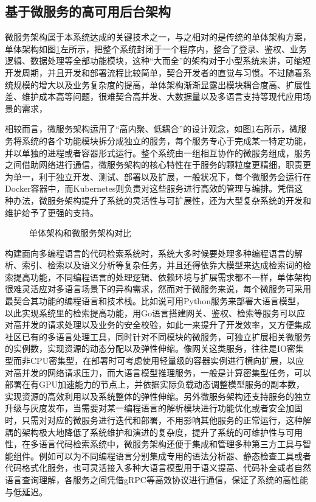 \documentclass[UTF8,a4paper,12pt]{ctexart}
\numberwithin{equation}{section}
\begin{document}
\subsection{基于微服务的高可用后台架构}
微服务架构属于本系统达成的关键技术之一，与之相对的是传统的单体架构方案，单体架构\cite{ref18.5}如图\ref{compare}左所示，把整个系统封闭于一个程序内，整合了登录、鉴权、业务逻辑、数据处理等全部功能模块，这种“大而全”的架构对于小型系统来讲，可缩短开发周期，并且开发和部署流程比较简单，契合开发者的直觉与习惯。不过随着系统规模的增大以及业务复杂度的提高，单体架构渐渐显露出模块耦合度高、扩展性差、维护成本高等问题，很难契合高并发、大数据量以及多语言支持等现代应用场景的需求，\par
相较而言，微服务架构运用了“高内聚、低耦合”的设计观念，如图\ref{compare}右所示，微服务将系统的各个功能模块拆分成独立的服务，每个服务专心于完成某一特定功能，并以单独的进程或者容器形式运行。整个系统由一组相互协作的微服务组成，服务之间借助网络进行通信，微服务架构的核心特性在于服务的颗粒度更精细，职责更为单一，利于独立开发、测试、部署以及扩展，一般状况下，每个微服务会运行在Docker容器中，而Kubernetes则负责对这些服务进行高效的管理与编排。凭借这种办法，微服务架构提升了系统的灵活性与可扩展性，还为大型复杂系统的开发和维护给予了更强的支持。\par
\begin{figure}[H]
	\caption{单体架构和微服务架构对比}
	\label{compare}
\end{figure}
构建面向多编程语言的代码检索系统时，系统大多时候要处理多种编程语言的解析、索引、检索以及语义分析等复杂任务，并且还得依靠大模型来达成检索词的检索提高功能，不同编程语言的处理逻辑、依赖环境与扩展需求都不一样，单体架构很难灵活应对多语言场景下的异构需求，然而对于微服务来说，每个微服务可采用最契合其功能的编程语言和技术栈。比如说可用Python服务来部署大语言模型，以此实现系统里的检索提高功能，用Go语言搭建网关、鉴权、检索等服务可以应对高并发的请求处理以及业务的安全校验，如此一来提升了开发效率，又方便集成社区已有的多语言处理工具，同时针对不同模块的微服务，可独立扩展相关微服务的实例数，实现资源的动态分配以及弹性伸缩。像网关这类服务，往往是IO密集型而非CPU密集型，在部署时可考虑使用轻量级的容器实例进行横向扩展，以应对高并发的网络请求压力，而大语言模型推理服务，一般是计算密集型任务，可以部署在有GPU加速能力的节点上，并依据实际负载动态调整模型服务的副本数，实现资源的高效利用以及系统整体的弹性伸缩。另外微服务架构还支持服务的独立升级与灰度发布，当需要对某一编程语言的解析模块进行功能优化或者安全加固时，只需对对应的微服务进行迭代和部署，不用影响其他服务的正常运行，这种解耦的架构极大地降低了系统维护和演进的复杂度，提升了系统的可维护性与可用性，在多语言代码检索系统中，微服务架构还便于集成和管理多种第三方工具与智能组件。例如可以为不同编程语言分别集成专用的语法分析器、静态检查工具或者代码格式化服务，也可灵活接入多种大语言模型用于语义提高、代码补全或者自然语言查询理解，各服务之间凭借gRPC等高效协议进行通信，保证了系统的高性能与低延迟。\par
\end{document}
